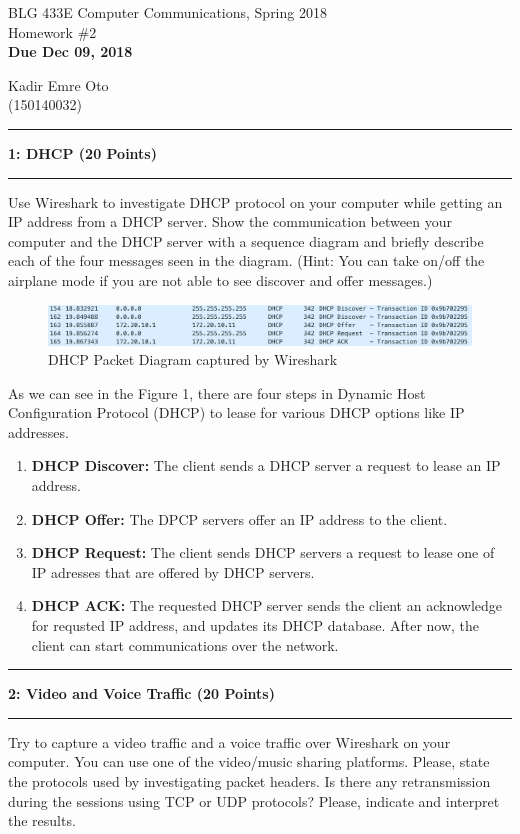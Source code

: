 \documentclass[11pt]{article}
\newcommand\question[2]{\vspace{.25in}\hrule\textbf{#1: #2}\vspace{.5em}\hrule\vspace{.10in}}
\newcommand\header[3]{\begin{center}{#1} \\ {#2} \\ \textbf{#3} \end{center}}
\begin{document}
\raggedright
	
	\header
	{BLG 433E Computer Communications, Spring 2018}
	{Homework \#2}
	{Due Dec 09, 2018}
	
	\begin{center}
		Kadir Emre Oto \\
		(150140032)
	\end{center}
	
	\question{1}{DHCP (20 Points)}
	
	Use Wireshark to investigate DHCP protocol on your computer while getting an IP address from a DHCP server. Show the communication between your computer and the DHCP server with a sequence diagram and briefly describe each of the four messages seen in the diagram. (Hint: You can take on/off the airplane mode if you are not able to see discover and offer messages.)
	
	\begin{figure}[h]
		\centering
		\includegraphics[width=1\linewidth]{dhcp}
		\caption{DHCP Packet Diagram captured by Wireshark}
	\end{figure}
	
	As we can see in the Figure 1, there are four steps in Dynamic Host Configuration Protocol (DHCP) to lease for various DHCP options like IP addresses. 
	
	\begin{enumerate}
		\item \textbf{DHCP Discover:} The client sends a DHCP server a request to lease an IP address.
		\item \textbf{DHCP Offer:} The DPCP servers offer an IP address to the client.
		\item \textbf{DHCP Request:} The client sends DHCP servers a request to lease one of IP adresses that are offered by DHCP servers.
		\item \textbf{DHCP ACK:} The requested DHCP server sends the client an acknowledge for requsted IP address, and updates its DHCP database. After now, the client can start communications over the network.
	\end{enumerate}
	
	\clearpage
	
	\question{2}{Video and Voice Traffic (20 Points)}
	
	Try to capture a video traffic and a voice traffic over Wireshark on your computer. You can use one of the video/music sharing platforms. Please, state the protocols used by investigating packet headers. Is there any retransmission during the sessions using TCP or UDP protocols? Please, indicate and interpret the results.
	
\end{document}
